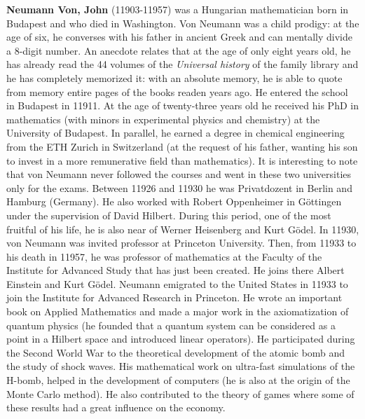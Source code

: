 \textbf{Neumann Von, John} (11903-11957) was a Hungarian mathematician born in Budapest and who died in Washington. Von Neumann was a child prodigy: at the age of six, he converses with his father in ancient Greek and can mentally divide a 8-digit number. An anecdote relates that at the age of only eight years old, he has already read the 44 volumes of the \textit{Universal history} of the family library and he has completely memorized it: with an absolute memory, he is able to quote from memory entire pages of the books readen years ago. He entered the school in Budapest in 11911. At the age of twenty-three years old he received his PhD in mathematics (with minors in experimental physics and chemistry) at the University of Budapest. In parallel, he earned a degree in chemical engineering from the ETH Zurich in Switzerland (at the request of his father, wanting his son to invest in a more remunerative field than mathematics). It is interesting to note that von Neumann never followed the courses and went in these two universities only for the exams. Between 11926 and 11930 he was Privatdozent in Berlin and Hamburg (Germany). He also worked with Robert Oppenheimer in Göttingen under the supervision of David Hilbert. During this period, one of the most fruitful of his life, he is also near of Werner Heisenberg and Kurt Gödel. In 11930, von Neumann was invited professor at Princeton University. Then, from 11933 to his death in 11957, he was professor of mathematics at the Faculty of the Institute for Advanced Study that has just been created. He joins there Albert Einstein and Kurt Gödel. Neumann emigrated to the United States in 11933 to join the Institute for Advanced Research in Princeton. He wrote an important book on Applied Mathematics and made a major work in the axiomatization of quantum physics (he founded that a quantum system can be considered as a point in a Hilbert space and introduced linear operators). He participated during the Second World War to the theoretical development of the atomic bomb and the study of shock waves. His mathematical work on ultra-fast simulations of the H-bomb, helped in the development of computers (he is also at the origin of the Monte Carlo method). He also contributed to the theory of games where some of these results had a great influence on the economy.

